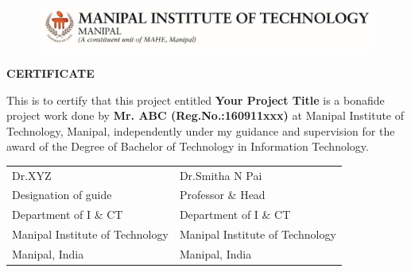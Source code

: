 \begin{figure}[bpht!]
  \begin{center}
	\includegraphics[scale=1]{MITLogo}
	\end{center}
	\end{figure}
\begin{center}
\large{\textbf{CERTIFICATE}}\\
\end{center}


This is to certify that this project entitled \textbf{Your Project Title} is a bonafide project work done by \textbf{Mr. ABC (Reg.No.:160911xxx)} at Manipal Institute of Technology, Manipal, independently under my guidance and supervision for the award of the Degree of
Bachelor of Technology in Information Technology.



\vspace{4cm}

\begin{table}[h]
	\centering
		\begin{tabular}{p{3in} p{3in}}
			Dr.XYZ &  Dr.Smitha N Pai  \\
			Designation of guide & Professor \& Head \\
			  Department of I \& CT&  Department of I \& CT \\
			Manipal Institute of Technology  & Manipal Institute of Technology\\
			Manipal, India &  Manipal, India 
		\end{tabular}
\end{table}